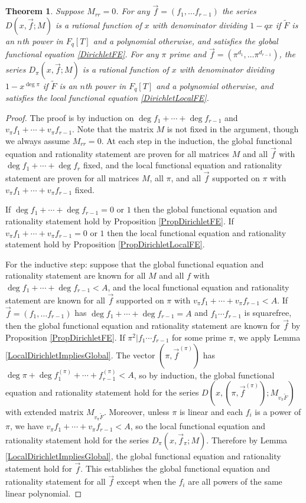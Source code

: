\documentclass[11pt,letterpaper]{article}
\newtheorem{theorem}{Theorem}[section]
\theoremstyle{definition}
\theoremstyle{remark}
\numberwithin{equation}{section}
\theoremstyle{dotless}
\renewcommand{\tilde}{\widetilde}
\begin{document}
\begin{theorem} \label{TheoremDirichletFE}
Suppose $M_{rr}=0$. For any $\vec{f}=(f_1, \ldots f_{r-1})$ the series $D(x, \vec{f}; M)$ is a rational function of $x$ with denominator dividing $1-qx$ if $\tilde{F}$ is an $n$th power in $F_q[T]$ and a polynomial otherwise, and satisfies the global functional equation \eqref{DirichletFE}. For any $\pi$ prime and $\vec{f}=(\pi^{d_1}, \ldots \pi^{d_{r-1}})$, the series $D_\pi(x, \vec{f}; M)$ is a rational function of $x$ with denominator dividing $1-x^{\deg \pi}$ if $\tilde{F}$ is an $n$th power in $F_q[T]$ and a polynomial otherwise, and satisfies the local functional equation \eqref{DirichletLocalFE}. 
\end{theorem}
\begin{proof}
The proof is by induction on $\deg f_1+\cdots + \deg f_{r-1}$ and $v_{\pi} f_1 + \cdots + v_\pi f_{r-1}$. Note that the matrix $M$ is not fixed in the argument, though we always assume $M_{rr}=0$. At each step in the induction, the global functional equation and rationality statement are proven for all matrices $M$ and all $\vec{f}$ with $\deg f_1 + \cdots + \deg f_r$ fixed, and the local functional equation and rationality statement are proven for all matrices $M$, all $\pi$, and all $\vec{f}$ supported on $\pi$ with $v_{\pi} f_1 + \cdots + v_\pi f_{r-1}$ fixed. 

If $\deg f_1+\cdots + \deg f_{r-1}=0$ or $1$ then the global functional equation and rationality statement hold by Proposition \ref{PropDirichletFE}. If $v_{\pi} f_1 + \cdots + v_\pi f_{r-1}=0$ or $1$ then the local functional equation and rationality statement hold by Proposition \ref{PropDirichletLocalFE}. 

For the inductive step: suppose that the global functional equation and rationality statement are known for all $M$ and all $f$ with $\deg f_1+\cdots + \deg f_{r-1}<A$, and the local functional equation and rationality statement are known for all $\vec{f}$ supported on $\pi$ with $v_{\pi} f_1 + \cdots + v_\pi f_{r-1}<A$. If $\vec{f}=(f_1, \ldots f_{r-1})$ has $\deg f_1+\cdots + \deg f_{r-1}=A$ and $f_1\cdots f_{r-1}$ is squarefree, then the global functional equation and rationality statement are known for $\vec{f}$ by Proposition \ref{PropDirichletFE}. If $\pi^2 | f_1\cdots f_{r-1}$ for some prime $\pi$, we apply Lemma \ref{LocalDirichletImpliesGlobal}. The vector $(\pi, \vec{f}^{(\pi)})$ has $\deg \pi + \deg f_1^{(\pi)} + \cdots + f_{r-1}^{(\pi)}< A$, so by induction, the global functional equation and rationality statement hold for the series $D(x, (\pi, \vec{f}^{(\pi)}); M_{v_\pi{\tilde{F}}})$ with extended matrix $M_{v_\pi{\tilde{F}}}$. Moreover, unless $\pi$ is linear and each $f_i$ is a power of $\pi$, we have $v_\pi f_1+\cdots + v_\pi f_{r-1} < A$, so the local functional equation and rationality statement hold for the series $D_\pi(x, \vec{f}_\pi; M)$. Therefore by Lemma \ref{LocalDirichletImpliesGlobal}, the global functional equation and rationality statement hold for $\vec{f}$. This establishes the global functional equation and rationality statement for all $\vec{f}$ except when the $f_i$ are all powers of the same linear polynomial. 


\end{proof}
\end{document}

